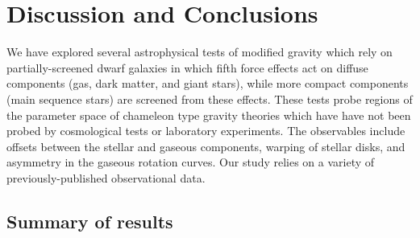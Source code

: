 \documentclass[twocolappendix, numberedappendix]{emulateapj}
\begin{document}
\section{Discussion and Conclusions}

\label{sec:discussion}
We have explored several astrophysical tests of modified gravity which rely on
partially-screened dwarf galaxies in which fifth force effects act on
diffuse components (gas, dark matter, and giant stars), while more
compact components (main sequence stars) are screened from these effects.
These tests probe regions of the parameter space of chameleon type gravity
theories which have have not been probed by cosmological tests or
laboratory experiments.  The observables include offsets between the stellar
and gaseous components, warping of stellar disks, and asymmetry in the
gaseous rotation curves. Our study relies on a variety of previously-published
observational data.

\subsection{Summary of results}
\end{document}
